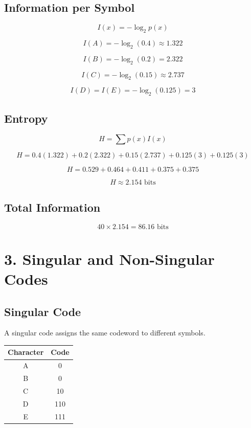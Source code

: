 \documentclass[12pt,oneside]{report}
\begin{document}
\subsection*{Information per Symbol}

\[
I(x) = -\log_2 p(x)
\]

\[
I(A) = -\log_2(0.4) \approx 1.322
\]

\[
I(B) = -\log_2(0.2) = 2.322
\]

\[
I(C) = -\log_2(0.15) \approx 2.737
\]

\[
I(D) = I(E) = -\log_2(0.125) = 3
\]

\subsection*{Entropy}

\[
H = \sum p(x) I(x)
\]

\[
H =
0.4(1.322)
+ 0.2(2.322)
+ 0.15(2.737)
+ 0.125(3)
+ 0.125(3)
\]

\[
H =
0.529
+ 0.464
+ 0.411
+ 0.375
+ 0.375
\]

\[
H \approx 2.154 \text{ bits}
\]

\subsection*{Total Information}

\[
40 \times 2.154 = 86.16 \text{ bits}
\]

\section*{3. Singular and Non-Singular Codes}

\subsection*{Singular Code}

A singular code assigns the same codeword to different symbols.

\begin{center}
\begin{tabular}{cc}
\toprule
Character & Code \\
\midrule
A & 0 \\
B & 0 \\
C & 10 \\
D & 110 \\
E & 111 \\
\bottomrule
\end{tabular}
\end{center}
\end{document}
